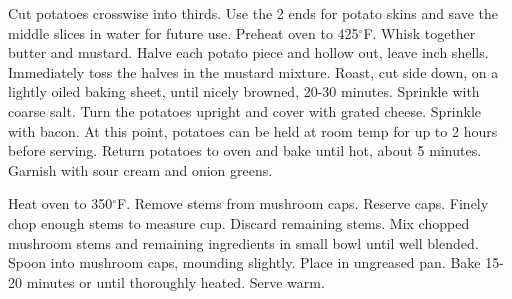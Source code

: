 \begin{minipage}{\linewidth}
\end{minipage}\par\begin{minipage}{\linewidth}  
{Cut potatoes crosswise into thirds. Use the 2 ends for potato skins and save the middle slices in water for future use. Preheat oven to 425$^\circ$F. Whisk together butter and mustard. Halve each potato piece and hollow out, leave  inch shells. Immediately toss the halves in the mustard mixture. Roast, cut side down, on a lightly oiled baking sheet, until nicely browned, 20-30 minutes. Sprinkle with coarse salt. Turn the potatoes upright and cover with grated cheese. Sprinkle with bacon. At this point, potatoes can be held at room temp for up to 2 hours before serving. Return potatoes to oven and bake until hot, about 5 minutes. Garnish with sour cream and onion greens.}

\end{minipage}\par\begin{minipage}{\linewidth} 
{Heat oven to 350$^\circ$F. Remove stems from mushroom caps. Reserve caps. Finely chop enough stems to measure  cup. Discard remaining stems. Mix chopped mushroom stems and remaining ingredients in small bowl until well blended. Spoon into mushroom caps, mounding slightly. Place in ungreased pan. Bake 15-20 minutes or until thoroughly heated. Serve warm.}


\end{minipage}
